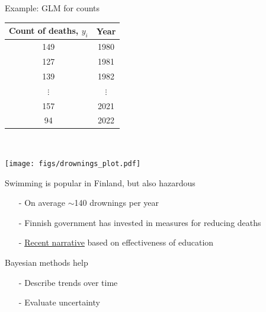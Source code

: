 \documentclass[finnish,english,t]{beamer}
\begin{document}
\begin{frame}{Example: GLM for counts}

{\footnotesize\vspace{-1mm}
    \begin{tabular}{c c}
      \vspace{-1mm} Count of deaths, $y_i$ & Year \\
      \hline \vspace{-1mm}
      149 & 1980 \\ \vspace{-1mm}
      127 & 1981 \\ \vspace{-1mm}
      139 & 1982 \\ \vspace{-1mm}
       $\vdots$ & $\vdots$ \\ \vspace{-1mm}
       157 & 2021 \\ \vspace{-1mm}
       94 & 2022
       
    \end{tabular}
  }~\parbox[t][2cm][b]{3.5cm}{\texttt{[image: figs/drownings\_plot.pdf]}}
  \vspace{2mm}
  \pause

  \vspace{-\baselineskip}
  Swimming is popular in Finland, but also hazardous 
    \begin{itemize}
      \item[-] On average $\sim$140 drownings per year
      \item[-] Finnish government has invested in measures for reducing deaths
      \item[-] \href{https://yle.fi/a/74-20048960}{Recent narrative} based on effectiveness of education 
      \end{itemize}
      
  \pause
   Bayesian methods help
    \begin{itemize}
    \item[-] Describe trends over time
    \item[-] Evaluate uncertainty
    \end{itemize}

\end{frame}
\end{document}
